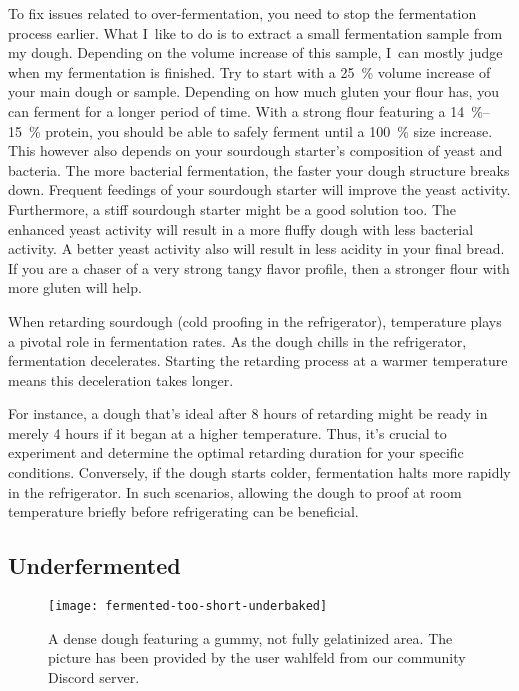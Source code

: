 To fix issues related to over-fermentation, you need to stop the fermentation process
earlier. What I~like to do is to extract a small fermentation sample from my dough.
Depending on the volume increase of this sample, I~can mostly judge when my fermentation
is finished. Try to start with a \qty{25}{\percent} volume increase of your
main dough or sample.  Depending on how much gluten your flour has, you can
ferment for a longer period of time.  With a strong flour featuring a
\qtyrange{14}{15}{\percent} protein, you should be able to safely ferment
until a \qty{100}{\percent} size increase. This however also depends on your
sourdough starter's composition of yeast and bacteria. The more bacterial fermentation,
the faster your dough structure breaks down. Frequent feedings of your sourdough
starter will improve the yeast activity. Furthermore, a stiff sourdough starter
might be a good solution too. The enhanced yeast activity will result in a more fluffy
dough with less bacterial activity. A better yeast activity also will result
in less acidity in your final bread. If you are a chaser of a very strong tangy
flavor profile, then a stronger flour with more gluten will help.

When retarding sourdough (cold proofing in the refrigerator), temperature plays a
pivotal role in fermentation rates.  As the dough chills in the refrigerator,
fermentation decelerates. Starting the retarding process at a warmer
temperature means this deceleration takes longer.

For instance, a dough that's ideal after 8 hours of retarding might be ready in
merely 4 hours if it began at a higher temperature. Thus, it's crucial to
experiment and determine the optimal retarding duration for your specific
conditions. Conversely, if the dough starts colder, fermentation halts more
rapidly in the refrigerator. In such scenarios, allowing the dough to proof at
room temperature briefly before refrigerating can be beneficial.

\subsection{Underfermented}

\begin{figure}
  \texttt{[image: fermented-too-short-underbaked]}
  \caption[Underfermented bread]{A dense dough featuring a gummy, not fully
      gelatinized area.  The picture has been provided by the user wahlfeld
      from our community Discord server.}%
  \label{fig:fermented-too-short-underbaked}
\end{figure}

